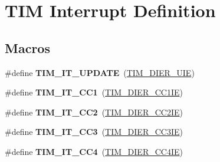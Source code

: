 \hypertarget{group___t_i_m___interrupt__definition}{\section{T\-I\-M Interrupt Definition}
\label{group___t_i_m___interrupt__definition}
}
\subsection*{Macros}
\begin{DoxyCompactItemize}
\item 
\hypertarget{group___t_i_m___interrupt__definition_ga6a48ecf88cae0402ff084202bfdd4f8e}{\#define {\bfseries T\-I\-M\-\_\-\-I\-T\-\_\-\-U\-P\-D\-A\-T\-E}~(\hyperlink{group___peripheral___registers___bits___definition_ga5c6d3e0495e6c06da4bdd0ad8995a32b}{T\-I\-M\-\_\-\-D\-I\-E\-R\-\_\-\-U\-I\-E})}\label{group___t_i_m___interrupt__definition_ga6a48ecf88cae0402ff084202bfdd4f8e}

\item 
\hypertarget{group___t_i_m___interrupt__definition_ga02267a938ab4722c5013fffa447cf5a6}{\#define {\bfseries T\-I\-M\-\_\-\-I\-T\-\_\-\-C\-C1}~(\hyperlink{group___peripheral___registers___bits___definition_ga1ba7f7ca97eeaf6cc23cd6765c6bf678}{T\-I\-M\-\_\-\-D\-I\-E\-R\-\_\-\-C\-C1\-I\-E})}\label{group___t_i_m___interrupt__definition_ga02267a938ab4722c5013fffa447cf5a6}

\item 
\hypertarget{group___t_i_m___interrupt__definition_ga60f6b6c424b62ca58d3fafd8f5955e4f}{\#define {\bfseries T\-I\-M\-\_\-\-I\-T\-\_\-\-C\-C2}~(\hyperlink{group___peripheral___registers___bits___definition_ga757c59b690770adebf33e20d3d9dec15}{T\-I\-M\-\_\-\-D\-I\-E\-R\-\_\-\-C\-C2\-I\-E})}\label{group___t_i_m___interrupt__definition_ga60f6b6c424b62ca58d3fafd8f5955e4f}

\item 
\hypertarget{group___t_i_m___interrupt__definition_ga6aef020aebafd9e585283fbbaf8b841f}{\#define {\bfseries T\-I\-M\-\_\-\-I\-T\-\_\-\-C\-C3}~(\hyperlink{group___peripheral___registers___bits___definition_ga4edf003f04bcf250bddf5ed284201c2e}{T\-I\-M\-\_\-\-D\-I\-E\-R\-\_\-\-C\-C3\-I\-E})}\label{group___t_i_m___interrupt__definition_ga6aef020aebafd9e585283fbbaf8b841f}

\item 
\hypertarget{group___t_i_m___interrupt__definition_ga1dce7f1bc32a258f2964cb7c05f413a6}{\#define {\bfseries T\-I\-M\-\_\-\-I\-T\-\_\-\-C\-C4}~(\hyperlink{group___peripheral___registers___bits___definition_ga6ad0f562a014572793b49fe87184338b}{T\-I\-M\-\_\-\-D\-I\-E\-R\-\_\-\-C\-C4\-I\-E})}\label{group___t_i_m___interrupt__definition_ga1dce7f1bc32a258f2964cb7c05f413a6}


\end{DoxyCompactItemize}
